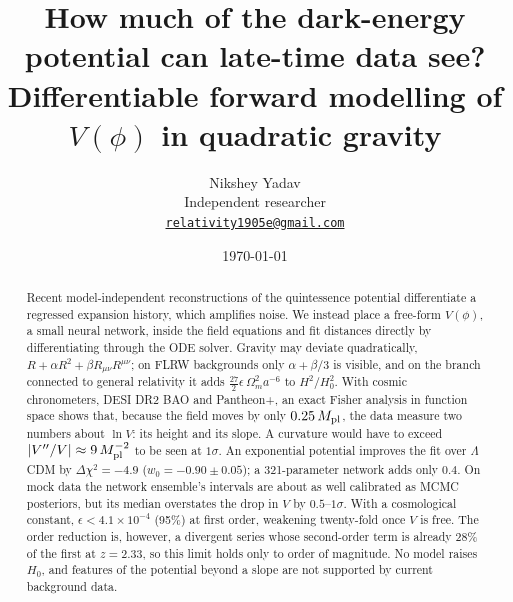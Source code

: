 \documentclass[11pt,a4paper]{article}
\title{How much of the dark-energy potential can late-time data see?\\[2pt]
\large Differentiable forward modelling of $V(\phi)$ in quadratic gravity}
\author{Nikshey Yadav\\[2pt] {\small Independent researcher}\\ {\small\href{mailto:relativity1905e@gmail.com}{\texttt{relativity1905e@gmail.com}}}}
\date{\today}
\newcommand{\Mpl}{M_{\rm pl}}
\begin{document}
\maketitle

\begin{abstract}
Recent model-independent reconstructions of the quintessence potential differentiate a regressed expansion history, which amplifies noise. We instead place a free-form $V(\phi)$, a small neural network, inside the field equations and fit distances directly by differentiating through the ODE solver. Gravity may deviate quadratically, $R+\alpha R^2+\beta R_{\mu\nu}R^{\mu\nu}$; on FLRW backgrounds only $\alpha+\beta/3$ is visible, and on the branch connected to general relativity it adds $\tfrac{27}{2}\epsilon\,\Omega_m^2a^{-6}$ to $H^2/H_0^2$. With cosmic chronometers, DESI DR2 BAO and Pantheon+, an exact Fisher analysis in function space shows that, because the field moves by only $0.25\,\Mpl$, the data measure two numbers about $\ln V$: its height and its slope. A curvature would have to exceed $|V''/V|\approx9\,\Mpl^{-2}$ to be seen at $1\sigma$. An exponential potential improves the fit over $\Lambda$CDM by $\Delta\chi^2=-4.9$ ($w_0=-0.90\pm0.05$); a 321-parameter network adds only $0.4$. On mock data the network ensemble's intervals are about as well calibrated as MCMC posteriors, but its median overstates the drop in $V$ by $0.5$--$1\sigma$. With a cosmological constant, $\epsilon<4.1\times10^{-4}$ (95\%) at first order, weakening twenty-fold once $V$ is free. The order reduction is, however, a divergent series whose second-order term is already 28\% of the first at $z=2.33$, so this limit holds only to order of magnitude. No model raises $H_0$, and features of the potential beyond a slope are not supported by current background data.
\end{abstract}

\end{document}

